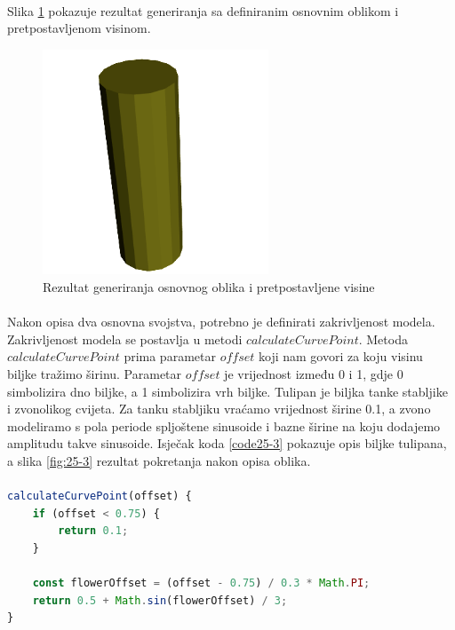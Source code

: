 \documentclass[times, utf8, diplomski]{fer}
\begin{document}
\paragraph{}
Slika \ref{fig:25-2} pokazuje rezultat generiranja sa definiranim osnovnim oblikom i 
pretpostavljenom visinom.

\begin{figure}[h]
	\centering
	\includegraphics[width=0.6\textwidth]{img/25-2}
	\caption{Rezultat generiranja osnovnog oblika i pretpostavljene visine}
	\label{fig:25-2}
\end{figure}

\paragraph{}
Nakon opisa dva osnovna svojstva, potrebno je definirati zakrivljenost modela. Zakrivljenost 
modela se postavlja u metodi $calculateCurvePoint$. Metoda $calculateCurvePoint$ prima 
parametar $offset$ koji nam govori za koju visinu biljke tražimo širinu. Parametar $offset$ 
je vrijednost između 0 i 1, gdje 0 simbolizira dno biljke, a 1 simbolizira vrh biljke.
Tulipan je biljka tanke stabljike i zvonolikog cvijeta. Za tanku stabljiku vraćamo 
vrijednost širine 0.1, a zvono modeliramo s pola periode spljoštene sinusoide i bazne 
širine na koju dodajemo amplitudu takve sinusoide. Isječak koda \ref{code25-3} pokazuje opis 
biljke tulipana, a slika \ref{fig:25-3} rezultat pokretanja nakon opisa oblika.
\paragraph{}
\begin{lstlisting}[language=Javascript,caption=Postavljanje oblika biljke u ovisnosti o visinu od tla,label=code25-3]
calculateCurvePoint(offset) {
	if (offset < 0.75) {
		return 0.1;
	}

	const flowerOffset = (offset - 0.75) / 0.3 * Math.PI;
	return 0.5 + Math.sin(flowerOffset) / 3;
}
\end{lstlisting}
\end{document}
